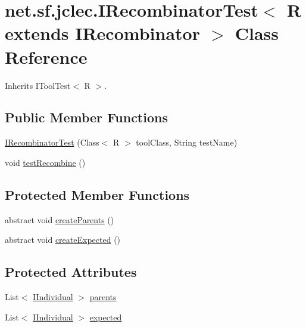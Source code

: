 \hypertarget{classnet_1_1sf_1_1jclec_1_1_i_recombinator_test_3_01_r_01extends_01_i_recombinator_01_4}{\section{net.\-sf.\-jclec.\-I\-Recombinator\-Test$<$ R extends I\-Recombinator $>$ Class Reference}
\label{classnet_1_1sf_1_1jclec_1_1_i_recombinator_test_3_01_r_01extends_01_i_recombinator_01_4}
}


Inherits I\-Tool\-Test$<$ R $>$.

\subsection*{Public Member Functions}
\begin{DoxyCompactItemize}
\item 
\hyperlink{classnet_1_1sf_1_1jclec_1_1_i_recombinator_test_3_01_r_01extends_01_i_recombinator_01_4_ae15f27042f8d36b7a35c03dd22ae55dc}{I\-Recombinator\-Test} (Class$<$ R $>$ tool\-Class, String test\-Name)
\item 
void \hyperlink{classnet_1_1sf_1_1jclec_1_1_i_recombinator_test_3_01_r_01extends_01_i_recombinator_01_4_a3cdc4f9a3e51a71344bfcfa2772150e1}{test\-Recombine} ()
\end{DoxyCompactItemize}
\subsection*{Protected Member Functions}
\begin{DoxyCompactItemize}
\item 
abstract void \hyperlink{classnet_1_1sf_1_1jclec_1_1_i_recombinator_test_3_01_r_01extends_01_i_recombinator_01_4_a90e55b953b9f6ff40534e12c78571141}{create\-Parents} ()
\item 
abstract void \hyperlink{classnet_1_1sf_1_1jclec_1_1_i_recombinator_test_3_01_r_01extends_01_i_recombinator_01_4_abd670e33547c103dba3366c345dc8c30}{create\-Expected} ()
\end{DoxyCompactItemize}
\subsection*{Protected Attributes}
\begin{DoxyCompactItemize}
\item 
List$<$ \hyperlink{interfacenet_1_1sf_1_1jclec_1_1_i_individual}{I\-Individual} $>$ \hyperlink{classnet_1_1sf_1_1jclec_1_1_i_recombinator_test_3_01_r_01extends_01_i_recombinator_01_4_a2c882a7f4b6490685308c41512a1d2e5}{parents}
\item 
List$<$ \hyperlink{interfacenet_1_1sf_1_1jclec_1_1_i_individual}{I\-Individual} $>$ \hyperlink{classnet_1_1sf_1_1jclec_1_1_i_recombinator_test_3_01_r_01extends_01_i_recombinator_01_4_adfca5e9d22442fb97fd88d93cabb8412}{expected}
\end{DoxyCompactItemize}


